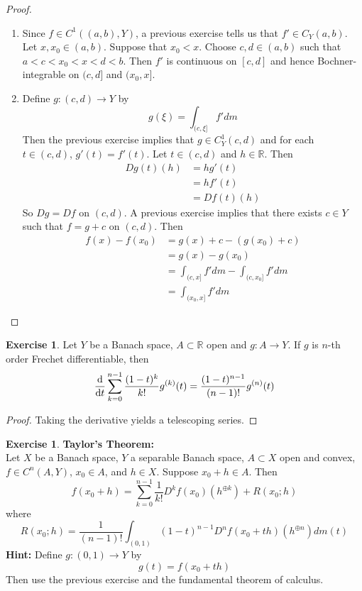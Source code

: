 \documentclass[12pt]{amsart}
\theoremstyle{definition}
\theoremstyle{remark}
\theoremstyle{definition}
\newtheorem{ex}[definition]{Exercise}
\newcommand{\R}{\mathbb{R}}
\begin{document}
	\begin{proof}
	\begin{enumerate}
	\item Since $f \in C^1((a,b), Y)$, a previous exercise tells us that $f' \in C_Y(a,b)$. Let $x, x_0 \in (a,b)$. Suppose that $x_0 < x$. Choose $c,d \in (a,b)$ such that $a < c < x_0< x< d < b$. Then $f'$ is continuous on $[c,d]$ and hence Bochner-integrable on $(c,d]$ and $(x_0,x]$. 
	\item Define $g: (c,d) \rightarrow Y$ by $$g(\xi) = \int_{(c, \xi]}f'dm$$
	Then the previous exercise implies that $g \in C^1_Y(c,d)$ and for each $t \in (c, d)$, $g'(t) = f'(t)$. Let $t \in (c,d)$ and $h \in \R$. Then
	\begin{align*}
	Dg(t)(h) 
	&= hg'(t) \\
	&= hf'(t) \\
	&= Df(t)(h)
	\end{align*}
	So $Dg = Df$ on $(c,d)$. A previous exercise implies that there exists $c \in Y$ such that $f = g + c$ on $(c, d)$. Then 
	\begin{align*}
	f(x) - f(x_0)
	&= g(x)+c - (g(x_0)+c) \\
	&= g(x) - g(x_0) \\
	&= \int_{(c, x]}f'dm - \int_{(c, x_0]}f'dm\\
	&= \int_{(x_0, x]}f'dm
	\end{align*}
	\end{enumerate}
	\end{proof}
	
	
	\begin{ex}
	Let $Y$ be a Banach space, $A \subset \R$ open and $g:A \rightarrow Y$. If $g$ is $n$-th order Frechet differentiable, then 
	$$\dv{t} \sum_{k=0}^{n-1} \frac{(1-t)^k}{k!}g^{(k)}(t) = \frac{(1-t)^{n-1}}{(n-1)!}g^{(n)}(t)$$
	\end{ex}
	
	\begin{proof}
	Taking the derivative yields a telescoping series.
	\end{proof}
	
	
	
	\begin{ex}\textbf{Taylor's Theorem:}\\
	Let $X$ be a Banach space, $Y$ a separable Banach space, $A \subset X$ open and convex, $f\in C^n(A, Y)$, $x_0 \in A$, and $h \in X$. Suppose $x_0 + h \in A$. Then $$f(x_0 + h) = \sum_{k=0}^{n-1} \frac{1}{k!} D^k f(x_0)(h^{\oplus k}) + R(x_0;h)$$ where $$R(x_0;h) = \frac{1}{(n-1)!}\int_{(0,1)} (1-t)^{n-1}D^nf(x_0 + th)(h^{\oplus n})d m(t)$$
	\textbf{Hint:} Define $g: (0,1) \rightarrow Y$ by $$g(t) = f(x_0 +t h)$$ Then use the previous exercise and the fundamental theorem of calculus.
	\end{ex}
	
\end{document}
